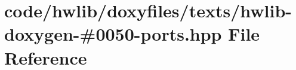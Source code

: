 \hypertarget{hwlib-doxygen-#0050-ports_8hpp}{}\section{code/hwlib/doxyfiles/texts/hwlib-\/doxygen-\/\#0050-\/ports.hpp File Reference}
\label{hwlib-doxygen-#0050-ports_8hpp}
